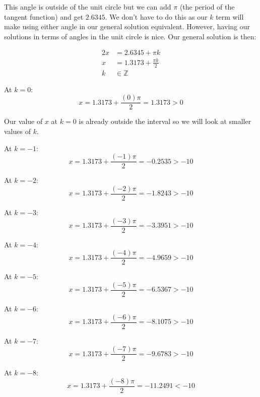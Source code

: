 \documentclass[12pt]{article}
\theoremstyle{definition}
\begin{document}
This angle is outside of the unit circle but we can add $\pi$ (the period of the tangent function) and get $2.6345$.
We don't have to do this as our $k$ term will make using either angle in our general solution equivalent.
However, having our solutions in terms of angles in the unit circle is nice.
Our general solution is then:

\begin{align}
    2x & = 2.6345 + \pi k           \\
    x  & = 1.3173 + \frac{\pi k}{2} \\
    k  & \in \mathbb{Z}
\end{align}

At $k=0$:
\begin{equation}
    x = 1.3173 + \frac{(0)\pi}{2} = 1.3173 > 0
\end{equation}

Our value of $x$ at $k=0$ is already outside the interval so we will look at smaller values of $k$.

At $k=-1$:
\begin{equation}
    x = 1.3173 + \frac{(-1)\pi}{2} = -0.2535 > -10
\end{equation}

At $k=-2$:
\begin{equation}
    x = 1.3173 + \frac{(-2)\pi}{2} = -1.8243 > -10
\end{equation}

At $k=-3$:
\begin{equation}
    x = 1.3173 + \frac{(-3)\pi}{2} = -3.3951 > -10
\end{equation}

At $k=-4$:
\begin{equation}
    x = 1.3173 + \frac{(-4)\pi}{2} = -4.9659 > -10
\end{equation}

At $k=-5$:
\begin{equation}
    x = 1.3173 + \frac{(-5)\pi}{2} = -6.5367 > -10
\end{equation}

At $k=-6$:
\begin{equation}
    x = 1.3173 + \frac{(-6)\pi}{2} = -8.1075 > -10
\end{equation}

At $k=-7$:
\begin{equation}
    x = 1.3173 + \frac{(-7)\pi}{2} = -9.6783 > -10
\end{equation}

At $k=-8$:
\begin{equation}
    x = 1.3173 + \frac{(-8)\pi}{2} = -11.2491 < -10
\end{equation}
\end{document}
